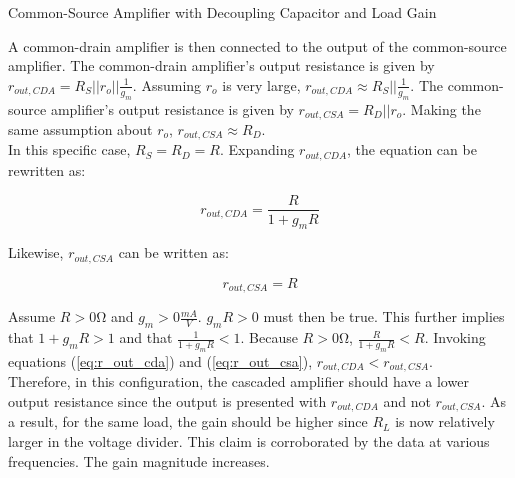 \FloatBarrier
\FloatBarrier

\begin{table}[h!]
	\centering
	\caption{Common-Source Amplifier with Decoupling Capacitor and Load Gain}
	\label{tab:gain_part3}
\end{table}

\FloatBarrier

A common-drain amplifier is then connected to the output of the common-source amplifier.
The common-drain amplifier's output resistance is given by $r_{out,CDA} = R_{S} || r_{o} || \frac{1}{g_{m}}$.
Assuming $r_{o}$ is very large, $r_{out,CDA} \approx R_{S} || \frac{1}{g_{m}}$.
The common-source amplifier's output resistance is given by $r_{out,CSA} = R_{D} || r_{o}$.
Making the same assumption about $r_{o}$, $r_{out,CSA} \approx R_{D}$. \\

In this specific case, $R_{S} = R_{D} = R$.
Expanding $r_{out,CDA}$, the equation can be rewritten as:

\begin{equation}
	\label{eq:r_out_cda}
	r_{out,CDA} = \frac{R}{1+g_{m}R}
\end{equation}

Likewise, $r_{out,CSA}$ can be written as:

\begin{equation}
	\label{eq:r_out_csa}
	r_{out,CSA} = R
\end{equation}

Assume $R > 0$\si{\ohm} and $g_{m} > 0 \frac{mA}{V}$.
$g_{m}R > 0$ must then be true.
This further implies that $1 + g_{m}R > 1$ and that $\frac{1}{1 + g_{m}R} < 1$.
Because $R > 0$\si{\ohm}, $\frac{R}{1 + g_{m}R} < R$.
Invoking equations (\ref{eq:r_out_cda}) and (\ref{eq:r_out_csa}), $r_{out,CDA} < r_{out,CSA}$. \\

Therefore, in this configuration, the cascaded amplifier should have a lower output resistance since the output is presented with $r_{out,CDA}$ and not $r_{out,CSA}$.
As a result, for the same load, the gain should be higher since $R_{L}$ is now relatively larger in the voltage divider.
This claim is corroborated by the data at various frequencies.
The gain magnitude increases.

\FloatBarrier


